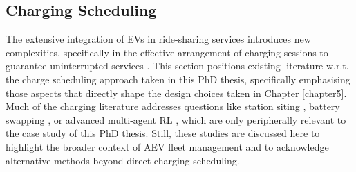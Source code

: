 




\subsection{Charging Scheduling}
\label{sec:charging_scheduling}

The extensive integration of EVs in ride-sharing services introduces new complexities, specifically in the effective arrangement of charging sessions to guarantee uninterrupted services \cite{Reference7}. This section positions existing literature w.r.t. the charge scheduling approach taken in this PhD thesis, specifically emphasising those aspects that directly shape the design choices taken in Chapter \ref{chapter5}. Much of the charging literature addresses questions like station siting \cite{luo2018optimal}, battery swapping \cite{su2024optimise}, or advanced multi-agent RL  \cite{tan2022fleet}, which are only peripherally relevant to the case study of this PhD thesis. Still, these studies are discussed here to highlight the broader context of AEV fleet management and to acknowledge alternative methods beyond direct charging scheduling.

